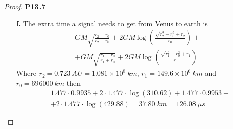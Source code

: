\documentclass[11pt]{article}
\theoremstyle{definition}
\begin{document}
\begin{proof}{\textbf{P13.7}}
\begin{itemize}
\cleardoublepage
\item [\textbf{f.}] The extra time a signal needs to get from Venus to earth
is 
\begin{align*}
    GM\sqrt{\frac{r_2 - r_0}{r_2 + r_0}} + 2GM\log(\frac{\sqrt{r_2^2 - r_0^2} + r_2}{r_0}) +\\
    + GM\sqrt{\frac{r_1 - r_0}{r_1 + r_0}} + 2GM\log(\frac{\sqrt{r_1^2 - r_0^2} + r_1}{r_0})
\end{align*}
Where $r_2 = 0.723~AU = 1.081 \times 10^8~km$, $r_1 = 149.6 \times 10^6~km$
and $r_0 = 696000~km$ then
\begin{align*}
    &1.477\cdot 0.9935 + 2\cdot 1.477 \cdot \log(310.62)
    + 1.477\cdot 0.9953 +\\
    &+ 2\cdot 1.477 \cdot \log(429.88) = 37.80~km = 126.08~\mu s
\end{align*}
\end{itemize}
\end{proof}
\end{document}
